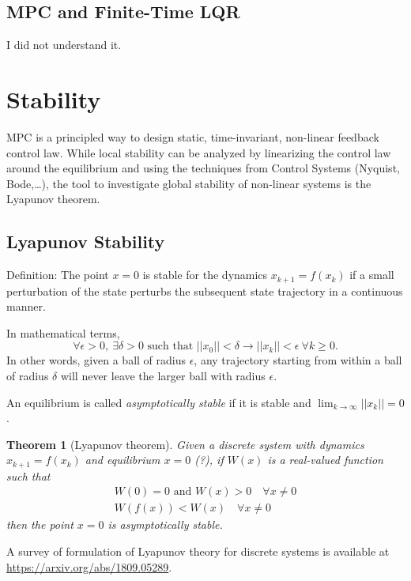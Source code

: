 \documentclass[11pt]{report}
\newtheorem{theorem}{Theorem}
\begin{document}
\subsection{MPC and Finite-Time LQR}
\label{sec:MPC-finite-time-LQR}

I did not understand it.


\section{Stability}
\label{sec:mpc-stability}

MPC is a principled way to design static, time-invariant, non-linear feedback control law. While local stability can be analyzed by linearizing the control law around the equilibrium and using the techniques from Control Systems (Nyquist, Bode,\ldots), the tool to investigate global stability of non-linear systems is the Lyapunov theorem.

\subsection{Lyapunov Stability}
\label{sec:lyapunov-stability}

Definition: The point $x=0$ is stable for the dynamics $x_{k+1} = f(x_k)$ if a small perturbation of the state perturbs the subsequent state trajectory in a continuous manner.

In mathematical terms,
\begin{equation}
  \label{eq:lyapunov-stability-stable-equilibrium}
  \forall \epsilon > 0,\ \exists \delta > 0 \text{ such that } ||x_0|| < \delta \rightarrow ||x_k|| < \epsilon\ \forall k \ge 0.
\end{equation}
In other words, given a ball of radius $\epsilon$, any trajectory starting from within a ball of radius $\delta$ will never leave the larger ball with radius $\epsilon$.

An equilibrium is called \emph{asymptotically stable} if it is stable and $\lim_{k\rightarrow \infty} ||x_k||=0$.

\begin{theorem}[Lyapunov theorem]
  \label{th:lyapunov}
  Given a discrete system with dynamics $x_{k+1} = f(x_k)$ and equilibrium $x=0$ (?), if $W(x)$ is a real-valued function such that
  \begin{align*}
    W(0)=0 \text{ and } W(x)>0\quad \forall x\neq 0 \\
    W(f(x)) < W(x)\quad \forall x\neq 0
  \end{align*}
  then the point $x=0$ is asymptotically stable.
\end{theorem}
A survey of formulation of Lyapunov theory for discrete systems is available at \url{https://arxiv.org/abs/1809.05289}.
\end{document}
